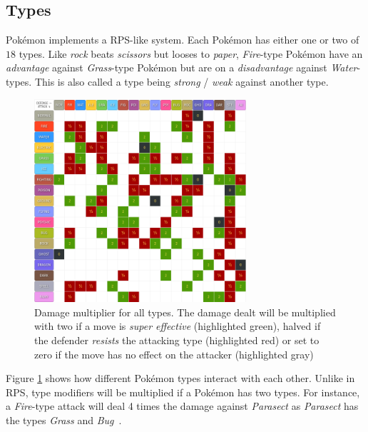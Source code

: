 \subsection{Types}
\label{sec:types}
Pokémon implements a \ac{RPS}-like system. Each Pokémon has either one or two of 
$18$ types. Like \emph{rock} beats \emph{scissors} but looses to \emph{paper}, \textit{Fire}-type Pokémon have an
\textit{advantage} against \textit{Grass}-type Pokémon but are on a \textit{disadvantage} against \textit{Water}-types.
This is also called a type being \textit{strong} / \textit{weak} against another type.
\begin{figure}
	\centering
	\includegraphics[width=0.7\textwidth]{images/type_chart.png}
	\caption{Damage multiplier for all types. The damage dealt will be multiplied with two if a move
	is \textit{super effective} (highlighted green), halved if the defender \textit{resists} the attacking
	type (highlighted red) or set to zero if the move has no effect on the attacker (highlighted 
	gray)~\autocite{Pokemondb:Type}}
	\label{fig:type_chart}
\end{figure}
Figure \ref{fig:type_chart} shows how different Pokémon types interact with each other.
Unlike in \ac{RPS}, type modifiers will be multiplied if a Pokémon has two types. For instance, a \textit{Fire}-type
attack will deal 4 times the damage against \textit{Parasect} as \textit{Parasect} has the types \textit{Grass} and
\textit{Bug}~\autocite{Veekun:Parasect}.

